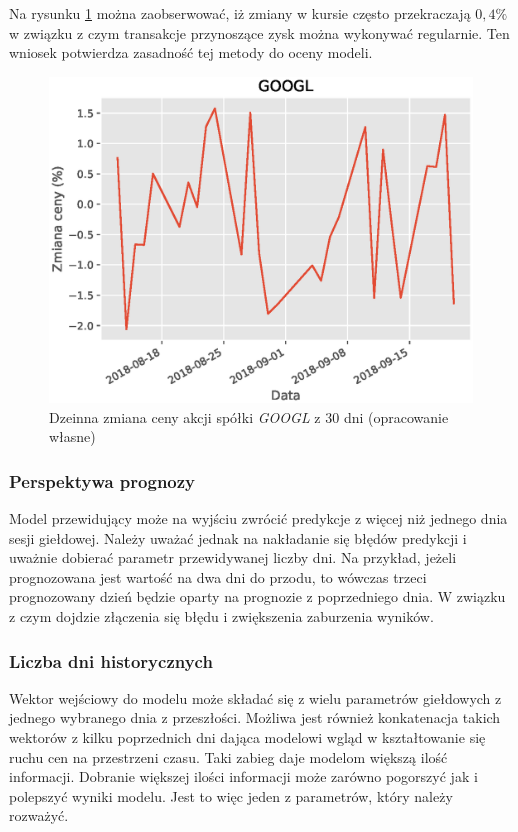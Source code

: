 \documentclass[a4paper, twoside, 11pt, openright]{article}
\begin{document}
Na rysunku \ref{l_r_pct_change_last_30} można zaobserwować, iż zmiany w kursie często przekraczają $0,4\%$ w związku z czym transakcje przynoszące zysk można wykonywać regularnie. Ten wniosek potwierdza zasadność tej metody do oceny modeli.

\begin{figure}[H]
\centering \includegraphics[scale=0.9]{img/linear_regression/l_r_pct_change_last_30}
\caption{Dzeinna zmiana ceny akcji spółki \textit{GOOGL} z 30 dni (opracowanie własne)}
\label{l_r_pct_change_last_30}
\end{figure}


\subsubsection{Perspektywa prognozy}

Model przewidujący może na wyjściu zwrócić predykcje z więcej niż jednego dnia sesji giełdowej. Należy uważać jednak na nakładanie się błędów predykcji i uważnie dobierać parametr przewidywanej liczby dni. Na przykład, jeżeli prognozowana jest wartość na dwa dni do przodu, to wówczas trzeci prognozowany dzień będzie oparty na prognozie z poprzedniego dnia. W związku z czym dojdzie złączenia się błędu i zwiększenia zaburzenia wyników.

\subsubsection{Liczba dni historycznych}

Wektor wejściowy do modelu może składać się z wielu parametrów giełdowych z jednego wybranego dnia z przeszłości. Możliwa jest również konkatenacja takich wektorów z kilku poprzednich dni dająca modelowi wgląd w kształtowanie się ruchu cen na przestrzeni czasu. Taki zabieg daje modelom większą ilość informacji. Dobranie większej ilości informacji może zarówno pogorszyć jak i polepszyć wyniki modelu. Jest to więc jeden z parametrów, który należy rozważyć.
\end{document}

